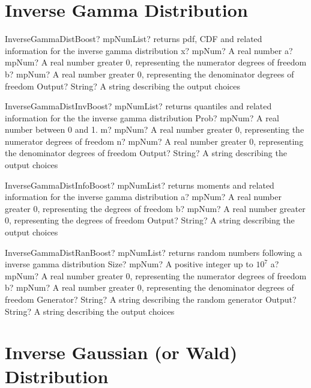 \documentclass[12pt,a4paper,openany]{book}
\begin{document}
\section{Inverse Gamma Distribution}

\begin{mpFunctionsExtract}
\mpFunctionFour
{InverseGammaDistBoost? mpNumList? returns pdf, CDF and related information for the inverse gamma distribution}
{x? mpNum? A real number}
{a? mpNum? A real number greater 0, representing the numerator  degrees of freedom}
{b? mpNum? A real number greater 0, representing the denominator degrees of freedom}
{Output? String? A string describing the output choices}
\end{mpFunctionsExtract}

\begin{mpFunctionsExtract}
\mpFunctionFour
{InverseGammaDistInvBoost? mpNumList? returns quantiles and related information for the the inverse gamma distribution}
{Prob? mpNum? A real number between 0 and 1.}
{m? mpNum? A real number greater 0, representing the numerator  degrees of freedom}
{n? mpNum? A real number greater 0, representing the denominator degrees of freedom}
{Output? String? A string describing the output choices}
\end{mpFunctionsExtract}

\begin{mpFunctionsExtract}
\mpFunctionThree
{InverseGammaDistInfoBoost? mpNumList? returns moments and related information for the inverse gamma distribution}
{a? mpNum? A real number greater 0, representing the degrees of freedom}
{b? mpNum? A real number greater 0, representing the degrees of freedom}
{Output? String? A string describing the output choices}
\end{mpFunctionsExtract}

\begin{mpFunctionsExtract}
\mpFunctionFive
{InverseGammaDistRanBoost? mpNumList? returns random numbers following a inverse gamma distribution}
{Size? mpNum? A positive integer up to $10^7$}
{a? mpNum? A real number greater 0, representing the numerator  degrees of freedom}
{b? mpNum? A real number greater 0, representing the denominator degrees of freedom}
{Generator? String? A string describing the random generator}
{Output? String? A string describing the output choices}
\end{mpFunctionsExtract}

\section{Inverse Gaussian (or Wald) Distribution}
\end{document}
